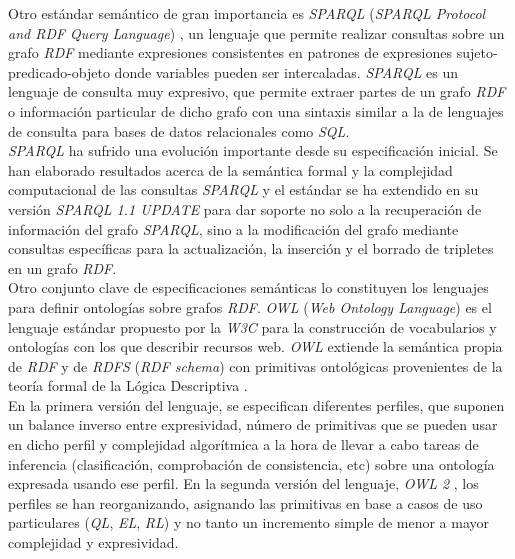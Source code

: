 Otro est\'andar sem\'antico de gran importancia es \textit{SPARQL} (\textit{SPARQL Protocol and RDF Query Language}) \cite{sparql}, un lenguaje que permite realizar consultas sobre un grafo \textit{RDF} mediante expresiones consistentes en patrones de expresiones sujeto-predicado-objeto donde variables pueden ser intercaladas. \textit{SPARQL} es un lenguaje de consulta muy expresivo, que permite extraer partes de un grafo \textit{RDF} o informaci\'on particular de dicho grafo con una sintaxis similar a la de lenguajes de consulta para bases de datos relacionales como \textit{SQL}.\\
\textit{SPARQL} ha sufrido una evoluci\'on importante desde su especificaci\'on inicial. Se han elaborado resultados acerca de la sem\'antica formal y la complejidad computacional de las consultas \textit{SPARQL} \cite{perez2006semantics} y el est\'andar se ha extendido en su versi\'on \textit{SPARQL 1.1 UPDATE} \cite{sparql11} para dar soporte no solo a la recuperaci\'on de informaci\'on del grafo \textit{SPARQL}, sino a la modificaci\'on del grafo mediante consultas espec\'ificas para la actualizaci\'on, la inserci\'on y el borrado de tripletes en un grafo \textit{RDF}.\\

Otro conjunto clave de especificaciones sem\'anticas lo constituyen los lenguajes para definir ontolog\'ias sobre grafos \textit{RDF}. \textit{OWL} (\textit{Web Ontology Language}) \cite{owl} es el lenguaje est\'andar propuesto por la \textit{W3C} para la construcci\'on de vocabularios y ontolog\'ias con los que describir recursos web. \textit{OWL} extiende la sem\'antica propia de \textit{RDF} y de \textit{RDFS} (\textit{RDF schema}) \cite{rdfs} con primitivas ontol\'ogicas provenientes de la teor\'ia formal de la L\'ogica Descriptiva \cite{owl_dl_reduction}.\\
En la primera versi\'on del lenguaje, se especifican diferentes perfiles, que suponen un balance inverso entre expresividad, n\'umero de primitivas que se pueden usar en dicho perfil y complejidad algor\'itmica a la hora de llevar a cabo tareas de inferencia (clasificaci\'on, comprobaci\'on de consistencia, etc) sobre una ontolog\'ia expresada usando ese perfil. En la segunda versi\'on del lenguaje, \textit{OWL 2} \cite{owl2}, los perfiles se han reorganizando, asignando las primitivas en base a casos de uso particulares (\textit{QL}, \textit{EL}, \textit{RL}) \cite{owl2_profiles} y no tanto un incremento simple de menor a mayor complejidad y expresividad.\\

